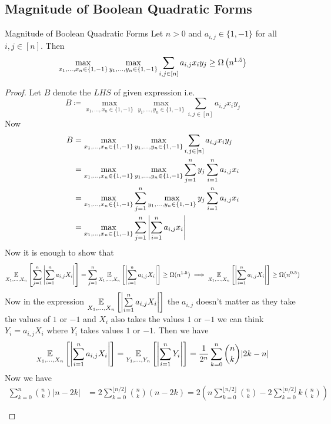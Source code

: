 \documentclass[twoside]{article}
\begin{document}
\subsection{Magnitude of Boolean Quadratic Forms}
\begin{lemma}{Magnitude of Boolean Quadratic Forms}{}
	Let $n>0$ and $a_{i,j}\in\{1,-1\}$ for all $i,j\in[n]$. Then $$\max_{x_1,\dots, x_n\in \{1,-1\}}\max_{y_1,\dots, y_n\in \{1,-1\}}\sum_{i,j\in[n]}a_{i,j}x_iy_j\geq \Omega\left(n^{1.5}\right)$$
\end{lemma}
\begin{proof}
	Let $B$ denote the $LHS$ of given expression i.e. $$B\coloneqq \max_{x_1,\dots, x_n\in \{1,-1\}}\max_{y_1,\dots, y_n\in \{1,-1\}}\sum_{i,j\in[n]}a_{i,j}x_iy_j$$Now\begin{align*}
		B& = \max_{x_1,\dots, x_n\in \{1,-1\}}\max_{y_1,\dots, y_n\in \{1,-1\}}\sum_{i,j\in[n]}a_{i,j}x_iy_j\\
		& = \max_{x_1,\dots, x_n\in \{1,-1\}}\max_{y_1,\dots, y_n\in \{1,-1\}}\sum_{j=1}^ny_j\sum_{i=1}^n a_{i,j}x_i\\
		& =  \max_{x_1,\dots, x_n\in \{1,-1\}}\sum_{j=1}^n\max_{y_1,\dots, y_n\in \{1,-1\}}y_j\sum_{i=1}^n a_{i,j}x_i\\
		& = \max_{x_1,\dots, x_n\in \{1,-1\}}\sum_{j=1}^n\left|\sum_{i=1}^n a_{i,j}x_i\right|\\
	\end{align*}Now it is enough to show that $$\underset{X_1,\dots, X_n}{\mathbb{E}}\left[\sum_{j=1}^n\left|\sum_{i=1}^na_{i,j}X_i\right|\right] =\sum_{j=1}^n\underset{X_1,\dots, X_n}{\mathbb{E}}\left[ \left|\sum_{i=1}^na_{i,j}X_i \right| \right]  \geq \Omega(n^{1.5})\implies \underset{X_1,\dots, X_n}{\mathbb{E}}\left[ \left|\sum\limits_{i=1}^na_{i,j}X_i \right| \right] \geq \Omega(n^{0.5})$$Now in the expression $\underset{X_1,\dots, X_n}{\mathbb{E}}\left[ \left|\sum\limits_{i=1}^na_{i,j}X_i \right| \right] $ the $a_{i,j}$ doesn't matter as they take the values of $1$ or $-1$ and $X_i$ also takes the values $1$ or $-1$ we can think $Y_i=a_{i,j}X_i$ where $Y_i $ takes values $1$ or $-1$. Then we have $$\underset{X_1,\dots, X_n}{\mathbb{E}}\left[ \left|\sum\limits_{i=1}^na_{i,j}X_i \right| \right]=\underset{Y_1,\dots, Y_n}{\mathbb{E}}\left[ \left|\sum\limits_{i=1}^nY_i \right| \right]=\frac1{2^n}\sum_{k=0}^n\binom{n}{k}|2k-n|$$ Now we have 
	\begin{align*}
		\sum_{k=0}^n\binom{n}k|n-2k|&=2\sum_{k=0}^{\lfloor n/2\rfloor}\binom{n}k(n-2k)=2\left(n\sum_{k=0}^{\lfloor n/2\rfloor}\binom{n}k-2\sum_{k=0}^{\lfloor n/2\rfloor}k\binom{n}k\right)\\\\

\end{align*}
\end{proof}
\end{document}
